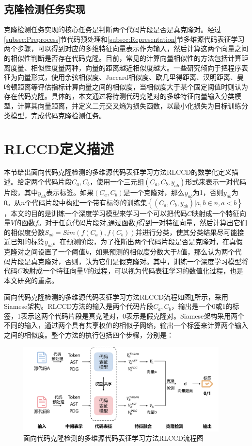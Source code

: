 \subsection{克隆检测任务实现}
\label{subsec:Clone detection}
克隆检测任务实现的核心任务是判断两个代码片段是否是真克隆对。经过\ref{subsec:Preprocess}节代码预处理和\ref{subsec:Representation}节多维源代码表征学习两个步骤，可以得到对应的多维特征向量表示作为输入，然后计算这两个向量之间的相似性判断是否存在代码克隆。目前，常见的计算向量相似性的方法包括计算距离度量\cite{FRENKLACH2021102386}、相似性度量\cite{Mallik2022ConRecMC}两种，向量的距离越近相似度越大。一些研究倾向于把程序表征为向量形式，使用余弦相似度、Jaccard相似度、欧几里得距离、汉明距离、曼哈顿距离等评估指标计算向量之间的相似度，当相似度大于某个固定阈值时则认为存在代码克隆。具体的，本文通过将待测代码克隆对的多维特征向量输入分类模型，计算其向量距离，并定义二元交叉熵为损失函数，以最小化损失为目标训练分类模型，完成代码克隆检测任务。

\section{RLCCD定义描述}
\label{sec:RLCCD flow}

本节给出面向代码克隆检测的多维源代码表征学习方法RLCCD的数学化定义描述。给定两个代码片段$C_{a},C_{b}$，使用一个三元组$(C_{a},C_{b},y_{ab})$形式来表示一对代码片段，其中$y_{ab}$表示标签。如果$(C_{a},C_{b})$是一个克隆对，那么$y_{ab}$为1，否则$y_{ab}$为0。从$n$个代码片段中构建一个带有标签的训练集$\left\{(C_{a},C_{b},y_{ab})|a,b \in n,a<b\right\}$，本文的目的是训练一个深度学习模型来学习一个可以把代码$C$映射成一个特征向量$V$的函数$f$。对于任意代码片段对,通过函数$f$得到一对特征向量，然后计算出它们的相似度分数$S_{ab} = Sim(f(C_{a}),f(C_{b}))$并进行分类，使其分类结果尽可能接近已知的标签$y_{ab}$。在预测阶段，为了推断出两个代码片段是否是克隆对，在真假克隆对之间设置了一个阈值$k$，如果预测的相似度分数大于$k$值，那么认为两个代码片段是真克隆对，否则，认为它们是假克隆对。其中，训练一个深度学习模型将代码$C$映射成一个特征向量$V$的过程，可以视为代码表征学习的数值化过程，也是本文研究的重点。

面向代码克隆检测的多维源代码表征学习方法RLCCD流程如图\ref{fig:flow}所示，采用Siamese架构。RLCCD方法的输入是两个代码片段$C_{a},C_{b}$，输出是一个0或1的标签，1表示这两个代码片段是真克隆对，0表示是假克隆对。Siamese架构采用两个不同的输入，通过两个具有共享权值的相似子网络，输出一个标签来计算两个输入之间的相似度。整个方法的执行包括四个步骤，分别是：
\begin{figure}[htp]
    \centering
    \includegraphics[width=0.95\textwidth]{figures/flow}
    \caption{面向代码克隆检测的多维源代码表征学习方法RLCCD流程图}
    \label{fig:flow}
\end{figure}


